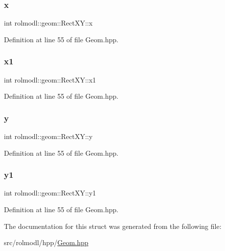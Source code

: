 \subsubsection{\texorpdfstring{x}{x}}
{\footnotesize\ttfamily int rolmodl\+::geom\+::\+Rect\+X\+Y\+::x}



Definition at line 55 of file Geom.\+hpp.

\mbox{\label{structrolmodl_1_1geom_1_1_rect_x_y_ae206fd9ea9f89161b512aacb3752db20}} 
\subsubsection{\texorpdfstring{x1}{x1}}
{\footnotesize\ttfamily int rolmodl\+::geom\+::\+Rect\+X\+Y\+::x1}



Definition at line 55 of file Geom.\+hpp.

\mbox{\label{structrolmodl_1_1geom_1_1_rect_x_y_ae00de498b3b6e06dc0e2379e4f73a1ed}} 
\subsubsection{\texorpdfstring{y}{y}}
{\footnotesize\ttfamily int rolmodl\+::geom\+::\+Rect\+X\+Y\+::y}



Definition at line 55 of file Geom.\+hpp.

\mbox{\label{structrolmodl_1_1geom_1_1_rect_x_y_a346e6cbedf70be8f442dbf35b635ad85}} 
\subsubsection{\texorpdfstring{y1}{y1}}
{\footnotesize\ttfamily int rolmodl\+::geom\+::\+Rect\+X\+Y\+::y1}



Definition at line 55 of file Geom.\+hpp.



The documentation for this struct was generated from the following file\+:\begin{DoxyCompactItemize}
\item 
src/rolmodl/hpp/\mbox{\hyperlink{_geom_8hpp}{Geom.\+hpp}}\end{DoxyCompactItemize}
